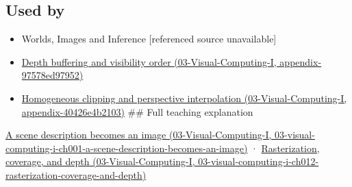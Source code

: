 \subsection{Used by}\label{appendix-ed3f9bc298fe-used-by}

\begin{itemize}
\item
  {Worlds, Images and Inference {[}referenced source unavailable{]}}
\item
  \href{../03-Visual-Computing-I/main.pdf\#nameddest=appendix-97578ed97952}{Depth buffering and visibility order (03-Visual-Computing-I, appendix-97578ed97952)}
\item
  \href{../03-Visual-Computing-I/main.pdf\#nameddest=appendix-40426e4b2103}{Homogeneous clipping and perspective interpolation (03-Visual-Computing-I, appendix-40426e4b2103)} \#\# Full teaching explanation
\end{itemize}

\href{../03-Visual-Computing-I/main.pdf\#nameddest=03-visual-computing-i-ch001-a-scene-description-becomes-an-image}{A scene description becomes an image (03-Visual-Computing-I, 03-visual-computing-i-ch001-a-scene-description-becomes-an-image)} · \href{../03-Visual-Computing-I/main.pdf\#nameddest=03-visual-computing-i-ch012-rasterization-coverage-and-depth}{Rasterization, coverage, and depth (03-Visual-Computing-I, 03-visual-computing-i-ch012-rasterization-coverage-and-depth)}
